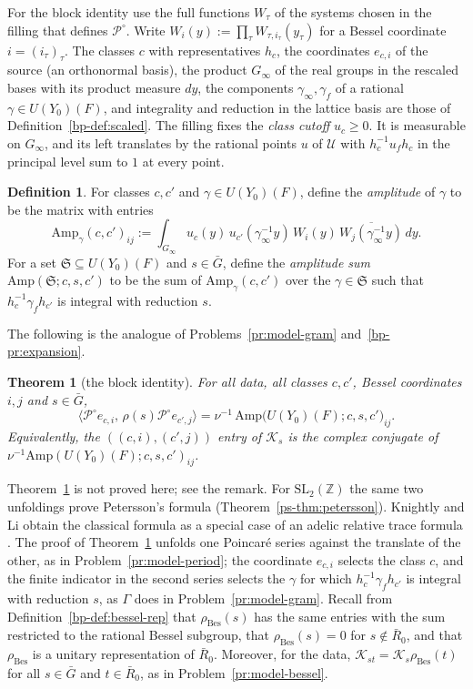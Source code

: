 \documentclass[reqno]{amsart}
\theoremstyle{definition}
\newtheorem{definition}{Definition}[section]
\theoremstyle{plain}
\newtheorem{theorem}{Theorem}[section]
\theoremstyle{remark}
\newcommand{\Z}{\mathbb{Z}}
\newcommand{\Gb}{\bar G}
\newcommand{\Rb}{\bar R_0}
\newcommand{\Kc}{\mathcal K}
\newcommand{\Uc}{\mathcal U}
\newcommand{\Po}{{\mathcal P^\circ}}
\newcommand{\Sf}{\mathfrak S}
\newcommand{\rB}{\rho_{\mathrm{Bes}}}
\newcommand{\Amp}{\mathrm{Amp}}
\begin{document}
For the block identity use the full functions \(W_\tau\) of the systems chosen in the filling that defines \(\Po\).  Write \(W_i(y):=\prod_\tau W_{\tau,i_\tau}(y_\tau)\) for a Bessel coordinate \(i=(i_\tau)_\tau\).  The classes \(c\) with representatives \(h_c\), the coordinates \(e_{c,i}\) of the source (an orthonormal basis), the product \(G_\infty\) of the real groups in the rescaled bases with its product measure \(dy\), the components \(\gamma_\infty,\gamma_f\) of a rational \(\gamma\in U(Y_0)(F)\), and integrality and reduction in the lattice basis are those of Definition~\ref{bp-def:scaled}.  The filling fixes the \emph{class cutoff} \(u_c\ge0\).  It is measurable on \(G_\infty\), and its left translates by the rational points \(u\) of \(\Uc\) with \(h_c^{-1}u_fh_c\) in the principal level sum to \(1\) at every point.

\begin{definition}\label{def:amplitude}
For classes \(c,c'\) and \(\gamma\in U(Y_0)(F)\), define the \emph{amplitude} of \(\gamma\) to be the matrix with entries
\[
 \Amp_\gamma(c,c')_{ij}:=\int_{G_\infty}u_c(y)\,u_{c'}(\gamma_\infty^{-1}y)\,W_i(y)\,\overline{W_j(\gamma_\infty^{-1}y)}\,dy .
\]
For a set \(\Sf\subseteq U(Y_0)(F)\) and \(s\in\Gb\), define the \emph{amplitude sum} \(\Amp(\Sf;c,s,c')\) to be the sum of \(\Amp_\gamma(c,c')\) over the \(\gamma\in\Sf\) such that \(h_c^{-1}\gamma_fh_{c'}\) is integral with reduction \(s\).
\end{definition}

The following is the analogue of Problems~\ref{pr:model-gram} and~\ref{bp-pr:expansion}.

\begin{theorem}[the block identity]\label{thm:blocks}
For all data, all classes \(c,c'\), Bessel coordinates \(i,j\) and \(s\in\Gb\),
\[
 \bigl\langle\Po e_{c,i},\,\rho(s)\Po e_{c',j}\bigr\rangle=\nu^{-1}\,\Amp\bigl(U(Y_0)(F);c,s,c'\bigr)_{ij} .
\]
Equivalently, the \(((c,i),(c',j))\) entry of \(\Kc_s\) is the complex conjugate of \(\nu^{-1}\Amp(U(Y_0)(F);c,s,c')_{ij}\).
\end{theorem}

\noindent Theorem~\ref{thm:blocks} is not proved here; see the remark.  For \(\mathrm{SL}_2(\Z)\) the same two unfoldings prove Petersson's formula (Theorem~\ref{ps-thm:petersson}).  Knightly and Li obtain the classical formula as a special case of an adelic relative trace formula \cite[Corollary~3.12]{KL}.  The proof of Theorem~\ref{thm:blocks} unfolds one Poincar\'e series against the translate of the other, as in Problem~\ref{pr:model-period}; the coordinate \(e_{c,i}\) selects the class \(c\), and the finite indicator in the second series selects the \(\gamma\) for which \(h_c^{-1}\gamma_fh_{c'}\) is integral with reduction \(s\), as \(\Gamma\) does in Problem~\ref{pr:model-gram}.  Recall from Definition~\ref{bp-def:bessel-rep} that \(\rB(s)\) has the same entries with the sum restricted to the rational Bessel subgroup, that \(\rB(s)=0\) for \(s\notin\Rb\), and that \(\rB\) is a unitary representation of \(\Rb\).  Moreover, for the data, \(\Kc_{st}=\Kc_s\rB(t)\) for all \(s\in\Gb\) and \(t\in\Rb\), as in Problem~\ref{pr:model-bessel}.
\end{document}
